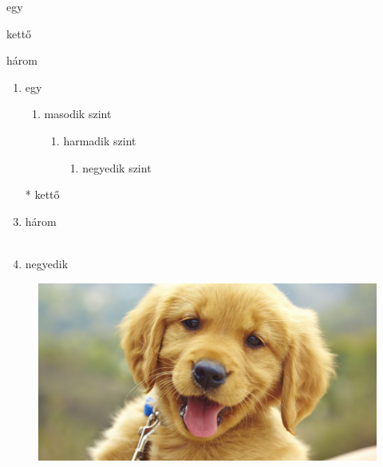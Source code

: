 \documentclass{article}
\newcommand{\myFigure}{
\centering
\includegraphics[scale=0.5] {kutya.jpg}
}
\begin{document}
\begin{itemize*}[label=*,itemjoin*={ 	, és }]
\item egy
\item kettő 
\item három
\end{itemize*}
\begin{enumerate}
\item egy
\begin{enumerate}
\item masodik szint
\begin{enumerate}
\item harmadik szint
\begin{enumerate}
\item negyedik szint

\end{enumerate}
\end{enumerate}
\end{enumerate}
\item[*] kettő
\item három
\\
\hulipsum[2-5]
\\
\item negyedik
\end{enumerate}
\begin{figure}
\myFigure
\end{figure}
\begin{description}
\item[címke] \hulipsum[1]
\item \hulipsum[2]
\item[ez egy hosszabb címke!] \hulipsum[3]
\end{description}
\end{document}
